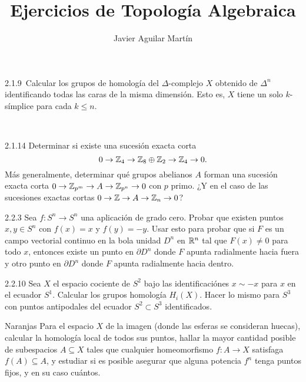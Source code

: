 \documentclass[twoside]{article}
\begin{document}
\title{Ejercicios de Topología Algebraica}
\author{Javier Aguilar Martín}
\maketitle

\begin{ejercicio}{2.1.9}\
Calcular los grupos de homología del $\Delta$-complejo $X$ obtenido de $\Delta^n$ identificando todas las caras de la misma dimensión. Esto es, $X$ tiene un solo $k$-símplice para cada $k\leq n$. 

 

\end{ejercicio}
\begin{solucion}\

\end{solucion}

\newpage

\begin{ejercicio}{2.1.14}
Determinar si existe una sucesión exacta corta $$0\to\mathbb{Z}_4\to \mathbb{Z}_8\oplus\mathbb{Z}_2\to \mathbb{Z}_4\to 0.$$ Más generalmente, determinar qué grupos abelianos $A$ forman una sucesión exacta corta $0\to\mathbb{Z}_{p^m}\to A\to\mathbb{Z}_{p^n}\to 0$ con $p$ primo. ¿Y en el caso de las sucesiones exactas cortas $0\to\mathbb{Z}\to A\to\mathbb{Z}_n\to 0$?
\end{ejercicio}
\begin{solucion}

\end{solucion}

\newpage

\begin{ejercicio}{2.2.3}
Sea $f:S^n\to S^n$ una aplicación de grado cero. Probar que existen puntos $x,y\in S^n$ con $f(x)=x$ y $f(y)=-y$. Usar esto para probar que si $F$ es un campo vectorial continuo en la bola unidad $D^n$ en $\mathbb{R}^n$ tal que $F(x)\neq 0$ para todo $x$, entonces existe un punto en $\partial D^n$ donde $F$ apunta radialmente hacia fuera y otro punto en $\partial D^n$ donde $F$ apunta radialmente hacia dentro.
\end{ejercicio}
\begin{solucion}
\end{solucion}

\newpage

\begin{ejercicio}{2.2.10}
Sea $X$ el espacio cociente de $S^2$ bajo las identificaciónes $x\sim-x$ para $x$ en el ecuador $S^1$. Calcular los grupos homología $H_i(X)$. Hacer lo mismo para $S^3$ con puntos antipodales del ecuador $S^2\subset S^3$ identificados. 
\end{ejercicio}
\begin{solucion}
\end{solucion}

\newpage


\begin{ejercicio}{Naranjas}
Para el espacio $X$ de la imagen (donde las esferas se consideran huecas), calcular la homología local de todos sus puntos, hallar la mayor cantidad posible de subespacios $A\subseteq X$ tales que cualquier homeomorfismo $f:A\to X$ satisfaga $f(A)\subseteq A$, y estudiar si es posible asegurar que alguna potencia $f^n$ tenga puntos fijos, y en su caso cuántos. 
\end{ejercicio}
\end{document}
